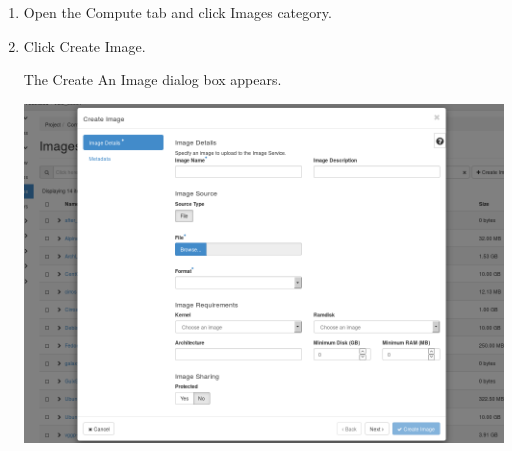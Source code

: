\begin{enumerate}
\item Open the Compute tab and click Images category.
\item Click Create Image.

  The Create An Image dialog box appears.
  \begin{center}
    \includegraphics[scale=0.4]{img/tab-compute-images-create.png}
  \end{center}


\end{enumerate}
